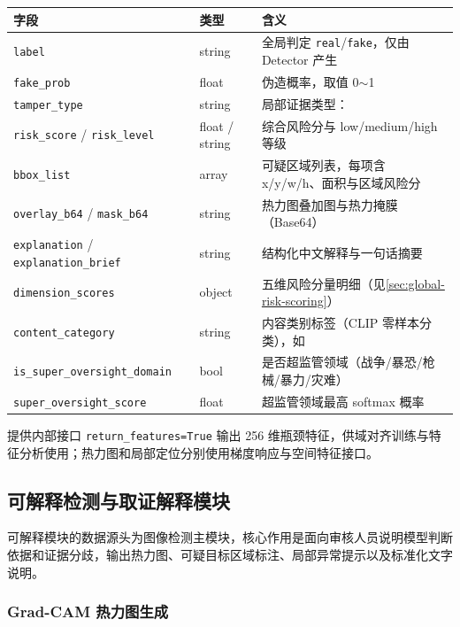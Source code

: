 \documentclass[UTF8, a4paper, 12pt]{ctexart}
\begin{document}
\begin{longtable}{@{}P{3.2cm}P{2cm}P{9cm}@{}}
\toprule
\textbf{字段} & \textbf{类型} & \textbf{含义} \\
\midrule
\endhead
\texttt{label} & string & 全局判定 \texttt{real}/\texttt{fake}，仅由 Detector 产生 \\
\texttt{fake\_prob} & float & 伪造概率，取值 0$\sim$1 \\
\texttt{tamper\_type} & string & 局部证据类型： \\
\texttt{risk\_score} / \texttt{risk\_level} & float / string & 综合风险分与 low/medium/high 等级 \\
\texttt{bbox\_list} & array & 可疑区域列表，每项含 x/y/w/h、面积与区域风险分 \\
\texttt{overlay\_b64} / \texttt{mask\_b64} & string & 热力图叠加图与热力掩膜（Base64） \\
\texttt{explanation} / \texttt{explanation\_brief} & string & 结构化中文解释与一句话摘要 \\
\texttt{dimension\_scores} & object & 五维风险分量明细（见\ref{sec:global-risk-scoring}） \\
\texttt{content\_category} & string & 内容类别标签（CLIP 零样本分类），如  \\
\texttt{is\_super\_oversight\_domain} & bool & 是否超监管领域（战争/暴恐/枪械/暴力/灾难） \\
\texttt{super\_oversight\_score} & float & 超监管领域最高 softmax 概率 \\
\bottomrule
\end{longtable}

提供内部接口 \texttt{return\_features=True} 输出 256 维瓶颈特征，供域对齐训练与特征分析使用；热力图和局部定位分别使用梯度响应与空间特征接口。

\subsection{可解释检测与取证解释模块}

可解释模块的数据源头为图像检测主模块，核心作用是面向审核人员说明模型判断依据和证据分歧，输出热力图、可疑目标区域标注、局部异常提示以及标准化文字说明。

\subsubsection{Grad-CAM 热力图生成}
\end{document}
